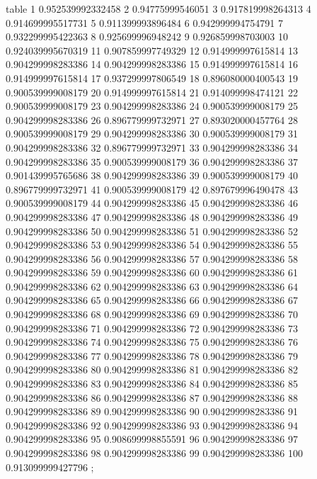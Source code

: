 table {%
	1 0.952539992332458
	2 0.94775999546051
	3 0.917819998264313
	4 0.914699995517731
	5 0.911399993896484
	6 0.942999994754791
	7 0.932299995422363
	8 0.925699996948242
	9 0.926859998703003
	10 0.924039995670319
	11 0.907859997749329
	12 0.914999997615814
	13 0.904299998283386
	14 0.904299998283386
	15 0.914999997615814
	16 0.914999997615814
	17 0.937299997806549
	18 0.896080000400543
	19 0.900539999008179
	20 0.914999997615814
	21 0.914099998474121
	22 0.900539999008179
	23 0.904299998283386
	24 0.900539999008179
	25 0.904299998283386
	26 0.896779999732971
	27 0.893020000457764
	28 0.900539999008179
	29 0.904299998283386
	30 0.900539999008179
	31 0.904299998283386
	32 0.896779999732971
	33 0.904299998283386
	34 0.904299998283386
	35 0.900539999008179
	36 0.904299998283386
	37 0.901439995765686
	38 0.904299998283386
	39 0.900539999008179
	40 0.896779999732971
	41 0.900539999008179
	42 0.897679996490478
	43 0.900539999008179
	44 0.904299998283386
	45 0.904299998283386
	46 0.904299998283386
	47 0.904299998283386
	48 0.904299998283386
	49 0.904299998283386
	50 0.904299998283386
	51 0.904299998283386
	52 0.904299998283386
	53 0.904299998283386
	54 0.904299998283386
	55 0.904299998283386
	56 0.904299998283386
	57 0.904299998283386
	58 0.904299998283386
	59 0.904299998283386
	60 0.904299998283386
	61 0.904299998283386
	62 0.904299998283386
	63 0.904299998283386
	64 0.904299998283386
	65 0.904299998283386
	66 0.904299998283386
	67 0.904299998283386
	68 0.904299998283386
	69 0.904299998283386
	70 0.904299998283386
	71 0.904299998283386
	72 0.904299998283386
	73 0.904299998283386
	74 0.904299998283386
	75 0.904299998283386
	76 0.904299998283386
	77 0.904299998283386
	78 0.904299998283386
	79 0.904299998283386
	80 0.904299998283386
	81 0.904299998283386
	82 0.904299998283386
	83 0.904299998283386
	84 0.904299998283386
	85 0.904299998283386
	86 0.904299998283386
	87 0.904299998283386
	88 0.904299998283386
	89 0.904299998283386
	90 0.904299998283386
	91 0.904299998283386
	92 0.904299998283386
	93 0.904299998283386
	94 0.904299998283386
	95 0.908699998855591
	96 0.904299998283386
	97 0.904299998283386
	98 0.904299998283386
	99 0.904299998283386
	100 0.913099999427796
};

